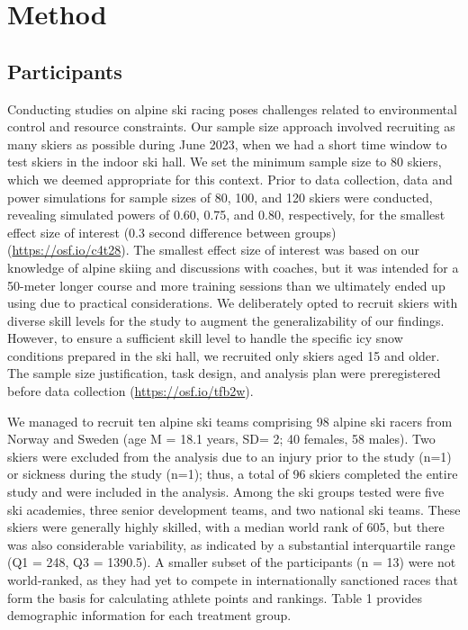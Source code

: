 \documentclass[pdflatex,sn-nature]{sn-jnl}%
\theoremstyle{thmstyleone}%
\theoremstyle{thmstyletwo}%
\theoremstyle{thmstylethree}%
\begin{document}
\section{Method}


\subsection{Participants}
Conducting studies on alpine ski racing poses challenges related to environmental control and resource constraints. Our sample size approach involved recruiting as many skiers as possible during June 2023, when we had a short time window to test skiers in the indoor ski hall. We set the minimum sample size to 80 skiers, which we deemed appropriate for this context. Prior to data collection, data and power simulations for sample sizes of 80, 100, and 120 skiers were conducted, revealing simulated powers of 0.60, 0.75, and 0.80, respectively, for the smallest effect size of interest (0.3 second difference between groups) (\url{https://osf.io/c4t28}). The smallest effect size of interest was based on our knowledge of alpine skiing and discussions with coaches, but it was intended for a 50-meter longer course and more training sessions than we ultimately ended up using due to practical considerations. We deliberately opted to recruit skiers with diverse skill levels for the study to augment the generalizability of our findings. However, to ensure a sufficient skill level to handle the specific icy snow conditions prepared in the ski hall, we recruited only skiers aged 15 and older. The sample size justification, task design, and analysis plan were preregistered before data collection (\url{https://osf.io/tfb2w}).

We managed to recruit ten alpine ski teams comprising 98 alpine ski racers from Norway and Sweden (age M = 18.1 years, SD= 2; 40 females, 58 males). Two skiers were excluded from the analysis due to an injury prior to the study (n=1) or sickness during the study (n=1); thus, a total of 96 skiers completed the entire study and were included in the analysis.  Among the ski groups tested were five ski academies, three senior development teams, and two national ski teams. These skiers were generally highly skilled, with a median world rank of 605, but there was also considerable variability, as indicated by a substantial interquartile range (Q1 = 248, Q3 = 1390.5). A smaller subset of the participants (n = 13) were not world-ranked, as they had yet to compete in internationally sanctioned races that form the basis for calculating athlete points and rankings. Table 1 provides demographic information for each treatment group.
\end{document}
